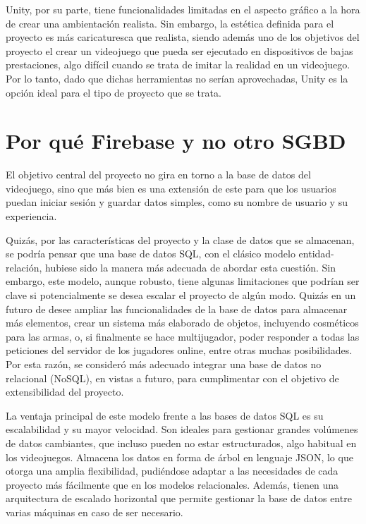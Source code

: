 \begin{description}
	Unity, por su parte, tiene funcionalidades limitadas en el aspecto gráfico a la hora de crear una ambientación realista. Sin embargo, la estética definida para el proyecto es más caricaturesca que realista, siendo además uno de los objetivos del proyecto el crear un videojuego que pueda ser ejecutado en dispositivos de bajas prestaciones, algo difícil cuando se trata de imitar la realidad en un videojuego. Por lo tanto, dado que dichas herramientas no serían aprovechadas, Unity es la opción ideal para el tipo de proyecto que se trata.
\end{description}

\section{Por qué Firebase y no otro SGBD}
El objetivo central del proyecto no gira en torno a la base de datos del videojuego, sino que más bien es una extensión de este para que los usuarios puedan iniciar sesión y guardar datos simples, como su nombre de usuario y su experiencia.

Quizás, por las características del proyecto y la clase de datos que se almacenan, se podría pensar que una base de datos SQL, con el clásico modelo entidad-relación, hubiese sido la manera más adecuada de abordar esta cuestión.
Sin embargo, este modelo, aunque robusto, tiene algunas limitaciones que podrían ser clave si potencialmente se desea escalar el proyecto de algún modo. Quizás en un futuro de desee ampliar las funcionalidades de la base de datos para almacenar más elementos, crear un sistema más elaborado de objetos, incluyendo cosméticos para las armas, o, si finalmente se hace multijugador, poder responder a todas las peticiones del servidor de los jugadores online, entre otras muchas posibilidades.\\
Por esta razón, se consideró más adecuado integrar una base de datos no relacional (NoSQL), en vistas a futuro, para cumplimentar con el objetivo de extensibilidad del proyecto.

La ventaja principal de este modelo frente a las bases de datos SQL es su escalabilidad y su mayor velocidad. Son ideales para gestionar grandes volúmenes de datos cambiantes, que incluso pueden no estar estructurados, algo habitual en los videojuegos. Almacena los datos en forma de árbol en lenguaje JSON, lo que otorga una amplia flexibilidad, pudiéndose adaptar a las necesidades de cada proyecto más fácilmente que en los modelos relacionales. Además, tienen una arquitectura de escalado horizontal que permite gestionar la base de datos entre varias máquinas en caso de ser necesario.


